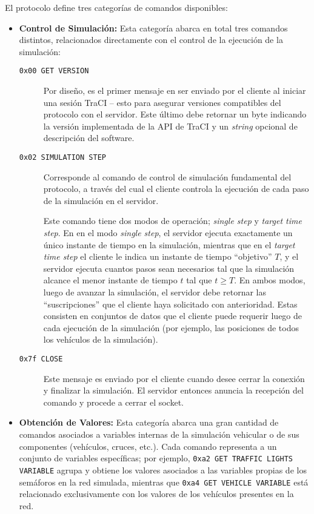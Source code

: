 El protocolo define tres categorías de comandos disponibles:

\begin{itemize}
    \item \textbf{Control de Simulación:} Esta categoría abarca en total tres comandos distintos, relacionados directamente con el control de la ejecución de la simulación:

    \begin{description}
        \item [\texttt{0x00 GET VERSION}] Por diseño, es el primer mensaje en ser enviado por el cliente al iniciar una sesión TraCI -- esto para asegurar versiones compatibles del protocolo con el servidor. Este último debe retornar un byte indicando la versión implementada de la API de TraCI y un \emph{string} opcional de descripción del software.
        
        \item [\texttt{0x02 SIMULATION STEP}] Corresponde al comando de control de simulación fundamental del protocolo, a través del cual el cliente controla la ejecución de cada paso de la simulación en el servidor.
        
        Este comando tiene dos modos de operación; \emph{single step} y \emph{target time step}. En en el modo \emph{single step}, el servidor ejecuta exactamente un único instante de tiempo en la simulación, mientras que en el \emph{target time step} el cliente le indica un instante de tiempo ``objetivo'' $T$, y el servidor ejecuta cuantos pasos sean necesarios tal que la simulación alcance el menor instante de tiempo $t$ tal que $t \geq T$. En ambos modos, luego de avanzar la simulación, el servidor debe retornar las ``suscripciones'' que el cliente haya solicitado con anterioridad. Estas consisten en conjuntos de datos que el cliente puede requerir luego de cada ejecución de la simulación (por ejemplo, las posiciones de todos los vehículos de la simulación).
        
        \item [\texttt{0x7f CLOSE}] Este mensaje es enviado por el cliente cuando desee cerrar la conexión y finalizar la simulación. El servidor entonces anuncia la recepción del comando y procede a cerrar el socket.
    \end{description}
    
    \item \textbf{Obtención de Valores:} Esta categoría abarca una gran cantidad de comandos asociados a variables internas de la simulación vehicular o de sus componentes (vehículos, cruces, etc.). Cada comando representa a un conjunto de variables específicas; por ejemplo, \texttt{0xa2 GET TRAFFIC LIGHTS VARIABLE} agrupa y obtiene los valores asociados a las variables propias de los semáforos en la red simulada, mientras que \texttt{0xa4 GET VEHICLE VARIABLE} está relacionado exclusivamente con los valores de los vehículos presentes en la red.
    

\end{itemize}
